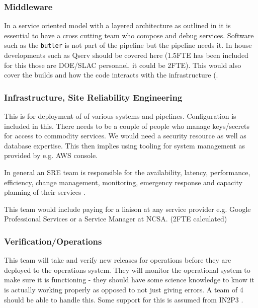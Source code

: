 \subsubsection{Middleware }
In a service oriented model with a layered architecture as outlined in  it is essential to have a cross cutting team who compose and debug services.
Software such as the \texttt{butler}  is not part of the pipeline but the pipeline needs it. In house developments such as \gls{Qserv} should be covered here (1.5FTE has been included for this those are  DOE/SLAC personnel, it could be 2FTE).
This would also cover the builds and how the code interacts with the infrastructure (.

\subsubsection{Infrastructure, Site Reliability Engineering  } \label{sec:infra}
This is for deployment of of various systems and pipelines. Configuration is included in this. There needs to be a couple of people who manage keys/secrets
for access to commodity services. We would need a security resource as well as database expertise.  This then implies using tooling for system management as
provided by e.g. \gls{AWS} console.

In general an \gls{SRE} team is responsible for the availability, latency, performance, efficiency, change management, monitoring, emergency response and capacity planning of their services \cite{Beyer:2016:SRE:3006357}.

This team would include paying for a liaison at any service provider e.g. Google Professional Services or a Service Manager at \gls{NCSA}. (2FTE calculated)

\subsubsection{Verification/Operations }
This team will take and verify new releases for operations before they are deployed to the operations system. They will monitor the operational system to make sure it is functioning - they should have some science knowledge to know it is actually working properly as opposed to not just giving errors. A team of 4 should be able to handle this.
Some support for this is assumed from IN2P3 .
